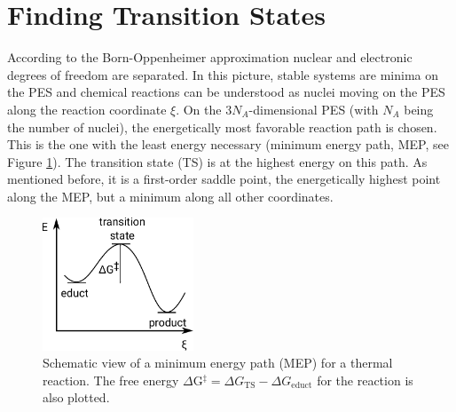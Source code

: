 \documentclass[11pt,DIV=13,BCOR=5mm,a4paper,headinclude]{scrbook}
\begin{document}
\section{Finding Transition States}\label{sec:tst}
According to the Born-Oppenheimer approximation\cite{bornoppenheimer} nuclear and electronic degrees of freedom are separated.
In this picture, stable systems are minima on the PES and chemical reactions can be understood as nuclei moving on the PES along the reaction coordinate $\xi$.
On the $3N_A$-dimensional PES (with $N_A$ being the number of nuclei), the energetically most favorable reaction path is chosen.
This is the one with the least energy necessary (minimum energy path, MEP, see Figure \ref{abb:mep}).
The transition state (TS) is at the highest energy on this path.
As mentioned before, it is a first-order saddle point, the energetically highest point along the MEP, but a minimum along all other coordinates.
\begin{figure}[!h]
\centering
 \includegraphics[width=0.4\textwidth]{figures/theory/MEP.pdf}
   \caption{Schematic view of a minimum energy path (MEP) for a thermal reaction.
The free energy $\Delta$G$^\ddagger= \Delta G_\textrm{TS}-\Delta G_\textrm{educt}$ for the reaction is also plotted.}
            \label{abb:mep}
\end{figure}
\end{document}
